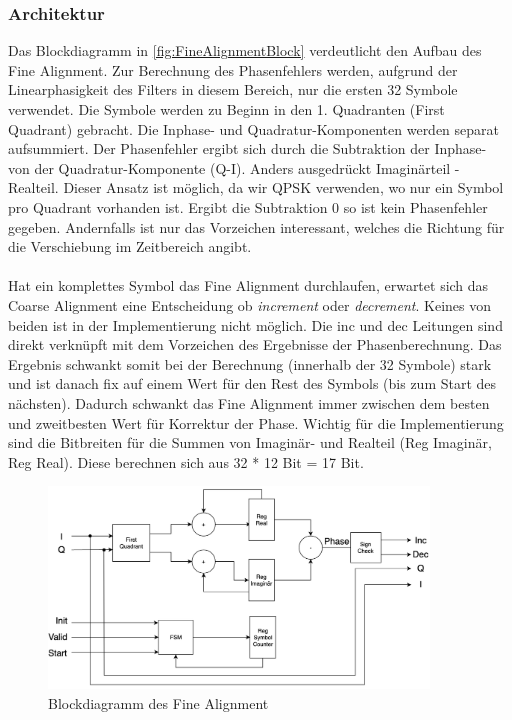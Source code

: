 \subsubsection{Architektur}
Das Blockdiagramm in \autoref{fig:FineAlignmentBlock} verdeutlicht den Aufbau des Fine Alignment. Zur Berechnung des Phasenfehlers werden, aufgrund der Linearphasigkeit des Filters in diesem Bereich, nur die ersten 32 Symbole verwendet. Die Symbole werden zu Beginn in den 1. Quadranten (First Quadrant) gebracht. Die Inphase- und Quadratur-Komponenten werden separat aufsummiert. Der Phasenfehler ergibt sich durch die Subtraktion der Inphase- von der Quadratur-Komponente (Q-I). Anders ausgedrückt Imaginärteil - Realteil. Dieser Ansatz ist möglich, da wir QPSK verwenden, wo nur ein Symbol pro Quadrant vorhanden ist. Ergibt die Subtraktion 0 so ist kein Phasenfehler gegeben. Andernfalls ist nur das Vorzeichen interessant, welches die Richtung für die Verschiebung im Zeitbereich angibt.\\
\\
Hat ein komplettes Symbol das Fine Alignment durchlaufen, erwartet sich das Coarse Alignment eine Entscheidung ob \textit{increment} oder \textit{decrement}. Keines von beiden ist in der Implementierung nicht möglich. Die inc und dec Leitungen sind direkt verknüpft mit dem Vorzeichen des Ergebnisse der Phasenberechnung. Das Ergebnis schwankt somit bei der Berechnung (innerhalb der 32 Symbole) stark und ist danach fix auf einem Wert für den Rest des Symbols (bis zum Start des nächsten). Dadurch schwankt das Fine Alignment immer zwischen dem besten und zweitbesten Wert für Korrektur der Phase. Wichtig für die Implementierung sind die Bitbreiten für die Summen von Imaginär- und Realteil (Reg Imaginär, Reg Real). Diese berechnen sich aus 32 * 12 Bit = 17 Bit.

\begin{figure}[htbp] 
	\centering
	\includegraphics[width=0.9\textwidth]{../img/FineAlignmentBlock.png}
	\caption{Blockdiagramm des Fine Alignment}
	\label{fig:FineAlignmentBlock}
\end{figure}

